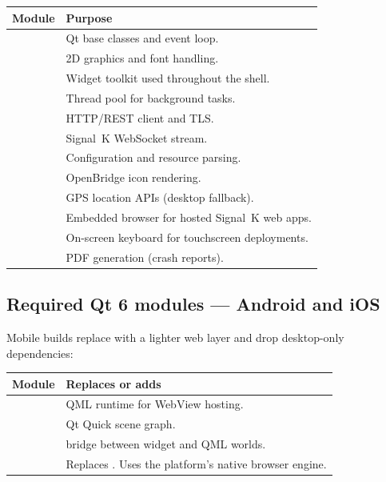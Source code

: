 \begin{longtable}{L{4.5cm}L{9.2cm}}
\toprule
{}
\color{white}\sffamily\bfseries Module &
\color{white}\sffamily\bfseries Purpose \\
\midrule
{}            & Qt base classes and event loop. \\
             & 2D graphics and font handling. \\
         & Widget toolkit used throughout the shell. \\
      & Thread pool for background tasks. \\
         & HTTP/REST client and TLS. \\
      & Signal~K WebSocket stream. \\
             & Configuration and resource parsing. \\
             & OpenBridge icon rendering. \\
     & GPS location APIs (desktop fallback). \\
& Embedded browser for hosted Signal~K web apps. \\
 & On-screen keyboard for touchscreen deployments. \\
    & PDF generation (crash reports). \\
\bottomrule
\end{longtable}

\subsection{Required Qt 6 modules --- Android and iOS}

Mobile builds replace  with a lighter web layer and
drop desktop-only dependencies:

\begin{longtable}{L{4.5cm}L{9.2cm}}
\toprule
{}
\color{white}\sffamily\bfseries Module &
\color{white}\sffamily\bfseries Replaces or adds \\
\midrule
{}         & QML runtime for WebView hosting. \\
       & Qt Quick scene graph. \\
&  bridge between widget and QML worlds. \\
     & Replaces . Uses the platform's native browser engine. \\
\bottomrule
\end{longtable}

